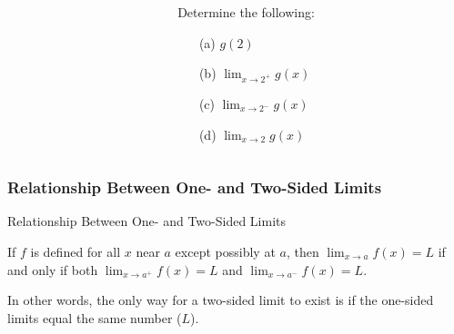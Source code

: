 \documentclass[cal1spr16Lectures.tex]{subfiles}
\begin{document}
\begin{frame}
\begin{exe}
\begin{columns}
\begin{column}{.45\textwidth}
\end{column}
\begin{column}{.45\textwidth}
	Determine the following:
	
	\vspace{0.25pc}
	\begin{itemize}
	\item[(a)] $g(2)$

	\vspace{0.25pc}	
	\item[(b)] $\lim_{x \to 2^+} g(x)$
	
	\vspace{0.25pc}
	\item[(c)] $\lim_{x \to 2^-} g(x)$
	
	\vspace{0.25pc}
	\item[(d)] $\lim_{x \to 2} g(x)$
	\end{itemize}
	\vspace{3pc}
\end{column}
\end{columns}
\end{exe}
\end{frame}

\subsubsection{Relationship Between One- and Two-Sided Limits}
\begin{frame}{\small Relationship Between One- and Two-Sided Limits}
\begin{thm}\footnotesize If $f$ is defined for all $x$ near $a$ except possibly at $a$, then $\lim_{x \to a} f(x)=L$ if and only if \alert{both} $\lim_{x \to a^+} f(x)=L$ \alert{and} $\lim_{x \to a^-} f(x)=L$. \end{thm}

In other words, the only way for a two-sided limit to exist is if the one-sided limits equal the same number ($L$).
\end{frame}
\end{document}
